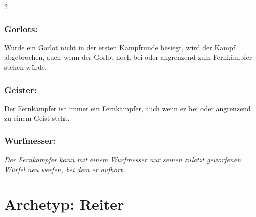 \documentclass[10pt, a4paper, oneside]{book}
\newcommand{\fan}[1]{\textit{#1}}
\begin{document}
\begin{multicols*}{2}
\begin{bgcolor}
\subsection{Gorlots:}

Wurde ein Gorlot nicht in der ersten Kampfrunde besiegt, wird der Kampf abgebrochen, auch wenn der Gorlot noch bei oder angrenzend zum Fernkämpfer stehen würde.
\supercite{127533}





\subsection{Geister:}

Der Fernkämpfer ist immer ein Fernkämpfer, auch wenn er bei oder angrenzend zu einem Geist steht.
\supercite{DfL:Begleitheft,DfL3:G}



\subsection{Wurfmesser:}

\fan{Der Fernkämpfer kann mit einem Wurfmesser nur seinen zuletzt geworfenen Würfel neu werfen, bei dem er aufhört.}


\end{bgcolor}


\end{multicols*}











\chapter{Archetyp: Reiter}
\label{Reiter}
\end{document}
